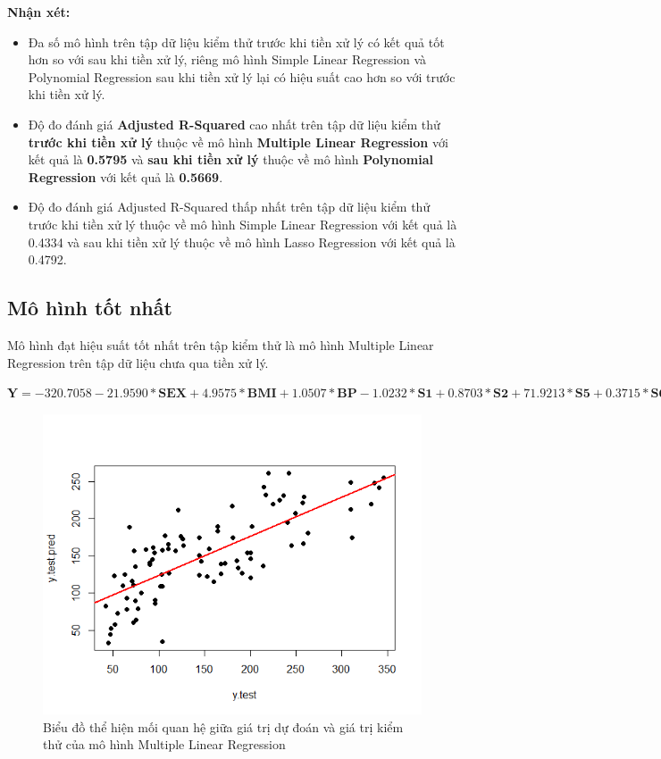 \documentclass[runningheads]{llncs}
\begin{document}
\textbf{Nhận xét:}
\begin{itemize}
	\item Đa số mô hình trên tập dữ liệu kiểm thử trước khi tiền xử lý có kết quả tốt hơn so với sau khi tiền xử lý, riêng mô hình Simple Linear Regression và Polynomial Regression sau khi tiền xử lý lại có hiệu suất cao hơn so với trước khi tiền xử lý.
	\item Độ đo đánh giá \textbf{Adjusted R-Squared} cao nhất trên tập dữ liệu kiểm thử \textbf{trước khi tiền xử lý} thuộc về mô hình \textbf{Multiple Linear Regression} với kết quả là \textbf{0.5795} và \textbf{sau khi tiền xử lý} thuộc về mô hình \textbf{Polynomial Regression} với kết quả là \textbf{0.5669}.
	\item Độ đo đánh giá Adjusted R-Squared thấp nhất trên tập dữ liệu kiểm thử trước khi tiền xử lý thuộc về mô hình Simple Linear Regression với kết quả là 0.4334 và sau khi tiền xử lý thuộc về mô hình Lasso Regression với kết quả là 0.4792.
\end{itemize}

\subsection{Mô hình tốt nhất}
Mô hình đạt hiệu suất tốt nhất trên tập kiểm thử là mô hình Multiple Linear Regression trên tập dữ liệu chưa qua tiền xử lý.

\begin{center}
	$\textbf{Y}=  -320.7058 -21.9590* \textbf{SEX} + 4.9575*\textbf{BMI} +  1.0507*\textbf{BP} -
	1.0232*\textbf{S1} + 0.8703*\textbf{S2} + 71.9213*\textbf{S5} + 0.3715*\textbf{S6} $
\end{center}

\begin{figure}[H]
\centering
\includegraphics[width=\textwidth]{Rplot}
\caption{Biểu đồ thể hiện mối quan hệ giữa giá trị dự đoán và giá trị kiểm thử của mô hình Multiple Linear Regression} \label{fig2}
\end{figure}
\end{document}
